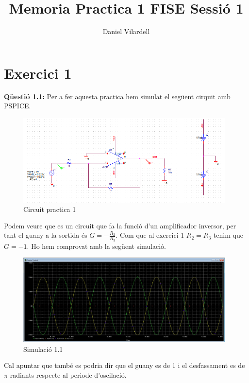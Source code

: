 \documentclass[12pt, a4papre]{article}
\author{Daniel Vilardell}
\title{Memoria Practica 1 FISE Sessió 1}
\date{}
\begin{document}
	\maketitle
	
	\tableofcontents
	\newpage
	
	\section{Exercici 1}
	
	\textbf{Qüestió 1.1:} Per a fer aquesta practica hem simulat el següent cirquit amb PSPICE.

	\begin{figure}[H]
		\begin{center}
		\includegraphics[width=110mm]{Circuit_inicial.PNG}
		\caption{Circuit practica 1}
		\end{center}
	\end{figure}
	
	Podem veure que es un circuit que fa la funció d'un amplificador inversor, per tant el guany a la sortida és $G = -\frac{R_2}{R_3}$. Com que al exercici 1 $R_2 = R_3$ tenim que $G = -1$. Ho hem comprovat amb la següent simulació.
	\begin{figure}[H]
		\begin{center}
		\includegraphics[width=110mm]{Captura_1.1.PNG}
		\caption{Simulació 1.1}
		\end{center}
	\end{figure}
	
	Cal apuntar que també es podria dir que el guany es de 1 i el desfassament es de $\pi$ radiants respecte al periode d'oscilació.
\end{document}
